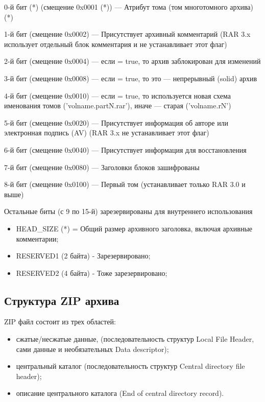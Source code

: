 0-й бит (*) (смещение 0x0001 (*)) — Атрибут тома (том многотомного архива) (*)

1-й бит (смещение 0x0002) — Присутствует архивный комментарий (RAR 3.x использует отдельный блок комментария и не устанавливает этот флаг)

2-й бит (смещение 0x0004) — если = true, то архив заблокирован для изменений

3-й бит (смещение 0x0008) — если = true, то это — непрерывный (solid) архив

4-й бит (смещение 0x0010) — если = true, то используется новая схема именования томов ('volname.partN.rar'), иначе — старая ('volname.rN')

5-й бит (смещение 0x0020) — Присутствует информация об авторе или электронная подпись (AV) (RAR 3.x не устанавливает этот флаг)

6-й бит (смещение 0x0040) — Присутствует информация для восстановления

7-й бит (смещение 0x0080) — Заголовки блоков зашифрованы

8-й бит (смещение 0x0100) — Первый том (устанавливает только RAR 3.0 и выше)

Остальные биты (с 9 по 15-й) зарезервированы для внутреннего использования

\begin{itemize}
\item HEAD\_SIZE (*) = Общий размер архивного заголовка, включая архивные комментарии;
\item RESERVED1 (2 байта) - Зарезервировано;
\item RESERVED2 (4 байта) - Тоже зарезервировано;
\end{itemize}

\subsection{Структура ZIP архива}                

ZIP файл состоит из трех областей:

\begin{itemize}
 \item сжатые/несжатые данные, (последовательность структур Local File Header, сами данные и необязательных Data descriptor);
 \item центральный каталог (последовательность структур Central directory file header);
 \item описание центрального каталога (End of central directory record).
\end{itemize}

